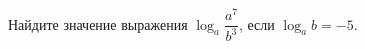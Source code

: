 \begin{ex}
	\begin{condition}
		Найдите значение выражения \( \log_a\dfrac{a^7}{b^3} \), если \( \log_a b = -5 \).
	\end{condition}
\end{ex}